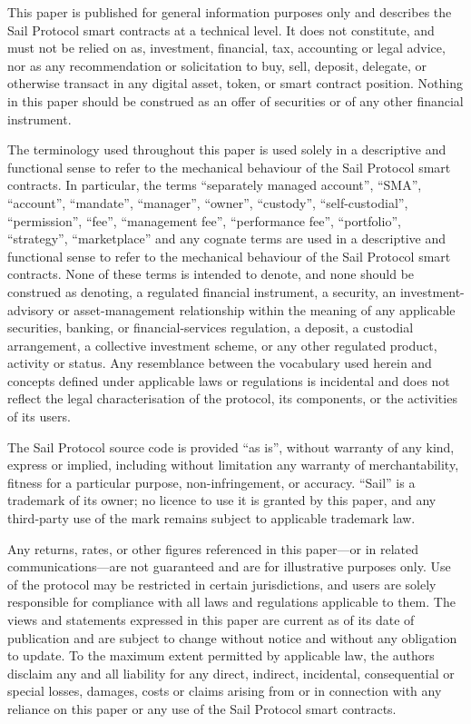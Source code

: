 \documentclass[11pt]{article}
\begin{document}
This paper is published for general information purposes only and describes the Sail Protocol smart contracts at a technical level. It does not constitute, and must not be relied on as, investment, financial, tax, accounting or legal advice, nor as any recommendation or solicitation to buy, sell, deposit, delegate, or otherwise transact in any digital asset, token, or smart contract position. Nothing in this paper should be construed as an offer of securities or of any other financial instrument.

The terminology used throughout this paper is used solely in a descriptive and functional sense to refer to the mechanical behaviour of the Sail Protocol smart contracts. In particular, the terms ``separately managed account'', ``SMA'', ``account'', ``mandate'', ``manager'', ``owner'', ``custody'', ``self-custodial'', ``permission'', ``fee'', ``management fee'', ``performance fee'', ``portfolio'', ``strategy'', ``marketplace'' and any cognate terms are used in a descriptive and functional sense to refer to the mechanical behaviour of the Sail Protocol smart contracts. None of these terms is intended to denote, and none should be construed as denoting, a regulated financial instrument, a security, an investment-advisory or asset-management relationship within the meaning of any applicable securities, banking, or financial-services regulation, a deposit, a custodial arrangement, a collective investment scheme, or any other regulated product, activity or status. Any resemblance between the vocabulary used herein and concepts defined under applicable laws or regulations is incidental and does not reflect the legal characterisation of the protocol, its components, or the activities of its users.

The Sail Protocol source code is provided ``as is'', without warranty of any kind, express or implied, including without limitation any warranty of merchantability, fitness for a particular purpose, non-infringement, or accuracy. ``Sail'' is a trademark of its owner; no licence to use it is granted by this paper, and any third-party use of the mark remains subject to applicable trademark law.

Any returns, rates, or other figures referenced in this paper---or in related communications---are not guaranteed and are for illustrative purposes only. Use of the protocol may be restricted in certain jurisdictions, and users are solely responsible for compliance with all laws and regulations applicable to them. The views and statements expressed in this paper are current as of its date of publication and are subject to change without notice and without any obligation to update. To the maximum extent permitted by applicable law, the authors disclaim any and all liability for any direct, indirect, incidental, consequential or special losses, damages, costs or claims arising from or in connection with any reliance on this paper or any use of the Sail Protocol smart contracts.
\end{document}
